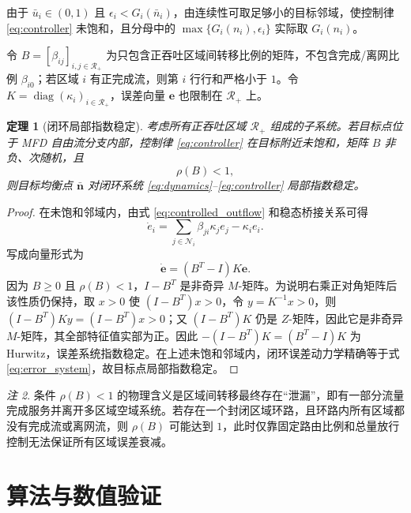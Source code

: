 \documentclass[a4paper,12pt]{article}
\theoremstyle{plain}
\newtheorem{theorem}{定理}[section]
\theoremstyle{definition}
\theoremstyle{remark}
\newtheorem{remark}[theorem]{注}
\begin{document}
由于 $\bar u_i\in(0,1)$ 且 $\epsilon_i<G_i(\bar n_i)$，由连续性可取足够小的目标邻域，使控制律 \eqref{eq:controller} 未饱和，且分母中的 $\max\{G_i(n_i),\epsilon_i\}$ 实际取 $G_i(n_i)$。

令 $B=[\beta_{ij}]_{i,j\in\mathcal R_+}$ 为只包含正吞吐区域间转移比例的矩阵，不包含完成/离网比例 $\beta_{i0}$；若区域 $i$ 有正完成流，则第 $i$ 行行和严格小于 $1$。令 $K=\operatorname{diag}(\kappa_i)_{i\in\mathcal R_+}$，误差向量 $\bm e$ 也限制在 $\mathcal R_+$ 上。

\begin{theorem}[闭环局部指数稳定]\label{thm:stability}
考虑所有正吞吐区域 $\mathcal R_+$ 组成的子系统。若目标点位于 MFD 自由流分支内部，控制律 \eqref{eq:controller} 在目标附近未饱和，矩阵 $B$ 非负、次随机，且
\begin{equation}\label{eq:rho}
    \rho(B)<1,
\end{equation}
则目标均衡点 $\bar{\bm n}$ 对闭环系统 \eqref{eq:dynamics}--\eqref{eq:controller} 局部指数稳定。
\end{theorem}

\begin{proof}
在未饱和邻域内，由式 \eqref{eq:controlled_outflow} 和稳态桥接关系可得
\begin{equation}
    \dot e_i
    =
    \sum_{j\in\mathcal N_i}\beta_{ji}\kappa_j e_j-\kappa_i e_i .
\end{equation}
写成向量形式为
\begin{equation}\label{eq:error_system}
    \dot{\bm e}
    =
    (B^T-I)K\bm e .
\end{equation}
因为 $B\ge0$ 且 $\rho(B)<1$，$I-B^T$ 是非奇异 $M$-矩阵。为说明右乘正对角矩阵后该性质仍保持，取 $x>0$ 使 $(I-B^T)x>0$，令 $y=K^{-1}x>0$，则 $(I-B^T)Ky=(I-B^T)x>0$；又 $(I-B^T)K$ 仍是 $Z$-矩阵，因此它是非奇异 $M$-矩阵，其全部特征值实部为正。因此 $-(I-B^T)K=(B^T-I)K$ 为 Hurwitz，误差系统指数稳定。在上述未饱和邻域内，闭环误差动力学精确等于式 \eqref{eq:error_system}，故目标点局部指数稳定。
\end{proof}

\begin{remark}
条件 $\rho(B)<1$ 的物理含义是区域间转移最终存在“泄漏”，即有一部分流量完成服务并离开多区域空域系统。若存在一个封闭区域环路，且环路内所有区域都没有完成流或离网流，则 $\rho(B)$ 可能达到 $1$，此时仅靠固定路由比例和总量放行控制无法保证所有区域误差衰减。
\end{remark}

\section{算法与数值验证}
\end{document}
